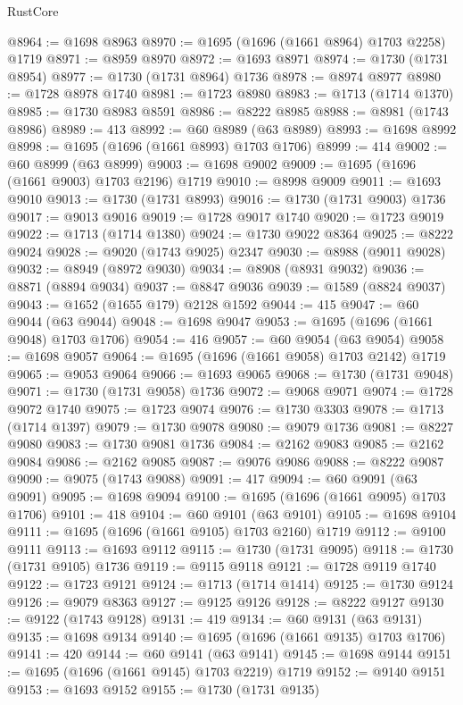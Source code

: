 \begin{lexlean}{RustCore}
\begin{coremodule}
@8964 := @1698 @8963
@8970 := @1695 (@1696 (@1661 @8964) @1703 @2258) @1719
@8971 := @8959 @8970
@8972 := @1693 @8971
@8974 := @1730 (@1731 @8954)
@8977 := @1730 (@1731 @8964) @1736
@8978 := @8974 @8977
@8980 := @1728 @8978 @1740
@8981 := @1723 @8980
@8983 := @1713 (@1714 @1370)
@8985 := @1730 @8983 @8591
@8986 := @8222 @8985
@8988 := @8981 (@1743 @8986)
@8989 := 413
@8992 := @60 @8989 (@63 @8989)
@8993 := @1698 @8992
@8998 := @1695 (@1696 (@1661 @8993) @1703 @1706)
@8999 := 414
@9002 := @60 @8999 (@63 @8999)
@9003 := @1698 @9002
@9009 := @1695 (@1696 (@1661 @9003) @1703 @2196) @1719
@9010 := @8998 @9009
@9011 := @1693 @9010
@9013 := @1730 (@1731 @8993)
@9016 := @1730 (@1731 @9003) @1736
@9017 := @9013 @9016
@9019 := @1728 @9017 @1740
@9020 := @1723 @9019
@9022 := @1713 (@1714 @1380)
@9024 := @1730 @9022 @8364
@9025 := @8222 @9024
@9028 := @9020 (@1743 @9025) @2347
@9030 := @8988 (@9011 @9028)
@9032 := @8949 (@8972 @9030)
@9034 := @8908 (@8931 @9032)
@9036 := @8871 (@8894 @9034)
@9037 := @8847 @9036
@9039 := @1589 (@8824 @9037)
@9043 := @1652 (@1655 @179) @2128 @1592
@9044 := 415
@9047 := @60 @9044 (@63 @9044)
@9048 := @1698 @9047
@9053 := @1695 (@1696 (@1661 @9048) @1703 @1706)
@9054 := 416
@9057 := @60 @9054 (@63 @9054)
@9058 := @1698 @9057
@9064 := @1695 (@1696 (@1661 @9058) @1703 @2142) @1719
@9065 := @9053 @9064
@9066 := @1693 @9065
@9068 := @1730 (@1731 @9048)
@9071 := @1730 (@1731 @9058) @1736
@9072 := @9068 @9071
@9074 := @1728 @9072 @1740
@9075 := @1723 @9074
@9076 := @1730 @3303
@9078 := @1713 (@1714 @1397)
@9079 := @1730 @9078
@9080 := @9079 @1736
@9081 := @8227 @9080
@9083 := @1730 @9081 @1736
@9084 := @2162 @9083
@9085 := @2162 @9084
@9086 := @2162 @9085
@9087 := @9076 @9086
@9088 := @8222 @9087
@9090 := @9075 (@1743 @9088)
@9091 := 417
@9094 := @60 @9091 (@63 @9091)
@9095 := @1698 @9094
@9100 := @1695 (@1696 (@1661 @9095) @1703 @1706)
@9101 := 418
@9104 := @60 @9101 (@63 @9101)
@9105 := @1698 @9104
@9111 := @1695 (@1696 (@1661 @9105) @1703 @2160) @1719
@9112 := @9100 @9111
@9113 := @1693 @9112
@9115 := @1730 (@1731 @9095)
@9118 := @1730 (@1731 @9105) @1736
@9119 := @9115 @9118
@9121 := @1728 @9119 @1740
@9122 := @1723 @9121
@9124 := @1713 (@1714 @1414)
@9125 := @1730 @9124
@9126 := @9079 @8363
@9127 := @9125 @9126
@9128 := @8222 @9127
@9130 := @9122 (@1743 @9128)
@9131 := 419
@9134 := @60 @9131 (@63 @9131)
@9135 := @1698 @9134
@9140 := @1695 (@1696 (@1661 @9135) @1703 @1706)
@9141 := 420
@9144 := @60 @9141 (@63 @9141)
@9145 := @1698 @9144
@9151 := @1695 (@1696 (@1661 @9145) @1703 @2219) @1719
@9152 := @9140 @9151
@9153 := @1693 @9152
@9155 := @1730 (@1731 @9135)

\end{coremodule}
\end{lexlean}
